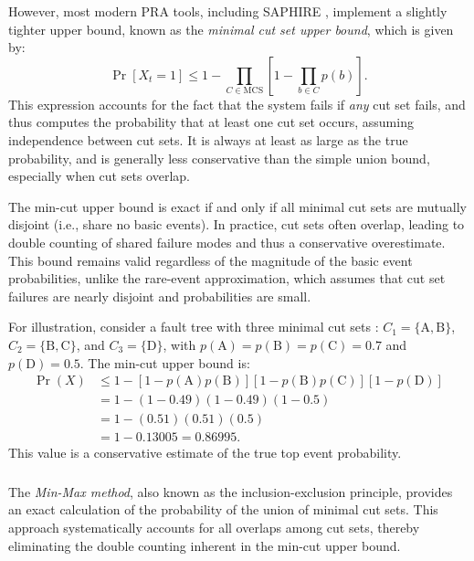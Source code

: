 However, most modern PRA tools, including SAPHIRE \cite{saphire1}, implement a slightly tighter upper bound, known as the \emph{minimal cut set upper bound}, which is given by:
\begin{equation}
\label{eq:mcub}
\Pr\left[X_t = 1\right] \leq 1 - \prod_{C \in \mathrm{MCS}} \left[1 - \prod_{b \in C} p(b)\right].
\end{equation}
This expression accounts for the fact that the system fails if \emph{any} cut set fails, and thus computes the probability that at least one cut set occurs, assuming independence between cut sets. It is always at least as large as the true probability, and is generally less conservative than the simple union bound, especially when cut sets overlap.

The min-cut upper bound is exact if and only if all minimal cut sets are mutually disjoint (i.e., share no basic events). In practice, cut sets often overlap, leading to double counting of shared failure modes and thus a conservative overestimate. This bound remains valid regardless of the magnitude of the basic event probabilities, unlike the rare-event approximation, which assumes that cut set failures are nearly disjoint and probabilities are small.

For illustration, consider a fault tree with three minimal cut sets \cite{saphire_manual}: $C_1 = \{\text{A}, \text{B}\}$, $C_2 = \{\text{B}, \text{C}\}$, and $C_3 = \{\text{D}\}$, with $p(\text{A}) = p(\text{B}) = p(\text{C}) = 0.7$ and $p(\text{D}) = 0.5$. The min-cut upper bound is:
\begin{align}
\Pr(X) &\leq 1 - \left[1 - p(\text{A})p(\text{B})\right]\left[1 - p(\text{B})p(\text{C})\right]\left[1 - p(\text{D})\right] \\
&= 1 - (1 - 0.49)(1 - 0.49)(1 - 0.5) \\
&= 1 - (0.51)(0.51)(0.5) \\
&= 1 - 0.13005 = 0.86995.
\end{align}
This value is a conservative estimate of the true top event probability.

\subsubsection{\color{green}{The Min-Max Method}}
The \emph{Min-Max method}, also known as the inclusion-exclusion principle, provides an exact calculation of the probability of the union of minimal cut sets. This approach systematically accounts for all overlaps among cut sets, thereby eliminating the double counting inherent in the min-cut upper bound.

